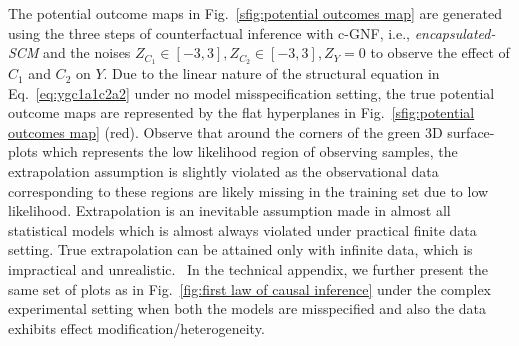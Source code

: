 \documentclass[letterpaper]{article} %
\begin{document}
The potential outcome maps in Fig.~\ref{sfig:potential  outcomes map} are generated using the three steps of counterfactual inference with c-GNF, i.e., \emph{encapsulated-SCM} and the noises $Z_{C_1}{ \in }[-3,3], Z_{C_2}{ \in }[-3,3], Z_Y{ = }0$ to observe the effect of $C_1$ and $C_2$ on $Y$.
Due to the linear nature of the structural equation in Eq.~\eqref{eq:ygc1a1c2a2} under no model misspecification setting, the true potential outcome maps are represented by the flat hyperplanes in Fig.~\ref{sfig:potential outcomes map} (red).
Observe that around the corners of the green 3D surface-plots which represents the low likelihood region of observing samples, the extrapolation assumption is slightly violated as the observational data corresponding to these regions are likely missing in the training set due to low likelihood. 
Extrapolation is an inevitable assumption made in almost all statistical models which is almost always violated under practical finite data setting.
True extrapolation can be attained only with infinite data, which is impractical and unrealistic.%
~In the technical appendix, we further present the same set of plots as in Fig.~\ref{fig:first law of causal inference} under the complex experimental setting when both the models are misspecified and also the data exhibits effect modification/heterogeneity.
\end{document}
